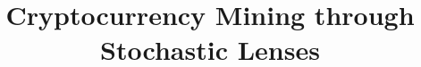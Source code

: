 \documentclass[format=acmsmall, review=false]{acmart}
\begin{document}
\title{Cryptocurrency Mining through Stochastic Lenses}



\maketitle










\newpage
\onecolumn
\appendix


\end{document}
